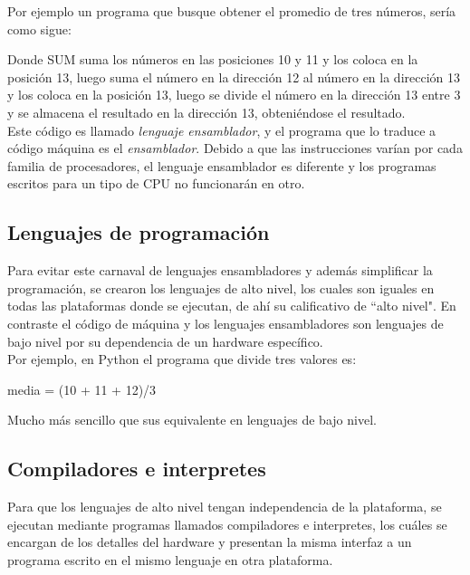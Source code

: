 Por ejemplo un programa que busque obtener el promedio de tres números, sería como sigue:\\


Donde SUM suma los números en las posiciones 10 y 11 y los coloca en la posición 13, luego suma el número en la dirección 12 al número en la dirección 13 y los coloca en la posición 13, luego se divide el número en la dirección 13 entre 3 y se almacena el resultado en la dirección 13, obteniéndose el resultado.\\

Este código es llamado \textit{lenguaje ensamblador}, y el programa que lo traduce a código máquina es el \textit{ensamblador}. Debido a que las instrucciones varían por cada familia de procesadores, el lenguaje ensamblador es diferente y los programas escritos para un tipo de CPU no funcionarán en otro.

\subsection{Lenguajes de programación}

Para evitar este carnaval de lenguajes ensambladores y además simplificar la programación, se crearon los lenguajes de alto nivel, los cuales son iguales en todas las plataformas donde se ejecutan, de ahí su calificativo de ``alto nivel". En contraste el código de máquina y los lenguajes ensambladores son lenguajes de bajo nivel por su dependencia de un hardware específico.\\

Por ejemplo, en Python el programa que divide tres valores es:

\begin{pyglist}
media = (10 + 11 + 12)/3
\end{pyglist}

Mucho más sencillo que sus equivalente en lenguajes de bajo nivel. 

\subsection{Compiladores e interpretes}

Para que los lenguajes de alto nivel tengan independencia de la plataforma, se ejecutan mediante programas llamados compiladores e interpretes, los cuáles se encargan de los detalles del hardware y presentan la misma interfaz a un programa escrito en el mismo lenguaje en otra plataforma.\\


